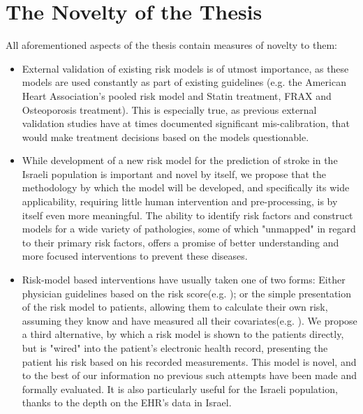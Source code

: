 \documentclass[a4paper,12pt]{article}
\begin{document}
	\section{The Novelty of the Thesis}
	
	All aforementioned aspects of the thesis contain measures of novelty to them:
	
	\begin{itemize}
		
		\item External validation of existing risk models is of utmost importance\cite{Moons2012}, as these models are used constantly as part of existing guidelines (e.g. the American Heart Association's pooled risk model and Statin treatment\cite{Goff2014}, FRAX and Osteoporosis treatment\cite{Kanis2008}). This is especially true, as previous external validation studies have at times documented significant mis-calibration\cite{Bastuji-Garin2002,Dagan2017}, that would make treatment decisions based on the models questionable.
		
		\item While development of a new risk model for the prediction of stroke in the Israeli population is important and novel by itself, we propose that the methodology by which the model will be developed, and specifically its wide applicability, requiring little human intervention and pre-processing, is by itself even more meaningful. The ability to identify risk factors and construct models for a wide variety of pathologies, some of which "unmapped" in regard to their primary risk factors, offers a promise of better understanding and more focused interventions to prevent these diseases.
		
		\item Risk-model based interventions have usually taken one of two forms: Either physician guidelines based on the risk score(e.g. \cite{Hippisley-Cox2008,DAgostino2008}); or the simple presentation of the risk model to patients, allowing them to calculate their own risk, assuming they know and have measured all their covariates(e.g. \cite{Parmar2015}). We propose a third alternative, by which a risk model is shown to the patients directly, but is "wired" into the patient's electronic health record, presenting the patient his risk based on his recorded measurements. This model is novel, and to the best of our information no previous such attempts have been made and formally evaluated. It is also particularly useful for the Israeli population, thanks to the depth on the EHR's data in Israel\cite{Lovis2015}.
		
	\end{itemize}
	
\end{document}
